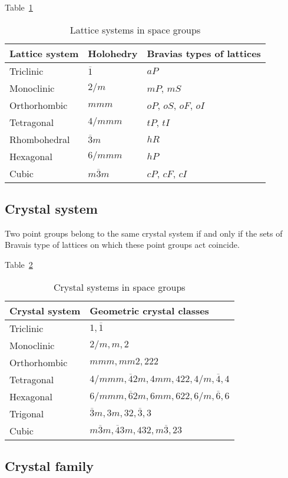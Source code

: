 
Table~\ref{tab:lattice_system}

\begin{table}[htb]
  \centering
  \caption{Lattice systems in space groups}
  \label{tab:lattice_system}
  \begin{tabular}[h]{lll}
    \hline
    Lattice system & Holohedry & Bravias types of lattices \\ \hline
    Triclinic    & $\overline{1}$   & $aP$                   \\
    Monoclinic   & $2/m$            & $mP$, $mS$             \\
    Orthorhombic & $mmm$            & $oP$, $oS$, $oF$, $oI$ \\
    Tetragonal   & $4/mmm$          & $tP$, $tI$             \\
    Rhombohedral & $\overline{3}m$  & $hR$                   \\
    Hexagonal    & $6/mmm$          & $hP$                   \\
    Cubic        & $m\overline{3}m$ & $cP$, $cF$, $cI$       \\ \hline
  \end{tabular}
\end{table}

\subsection{\label{sec:crystal-system}Crystal system}

\todo{}

Two point groups belong to the same crystal system if and only if the sets of Bravais type of lattices on which these point groups act coincide.

Table~\ref{tab:crystal_system}

\begin{table}[htb]
  \centering
  \caption{Crystal systems in space groups}
  \label{tab:crystal_system}
  \begin{tabular}{ll}
    \hline
    Crystal system & Geometric crystal classes                                \\ \hline
    Triclinic      & $1, \overline{1}$                                        \\
    Monoclinic     & $2/m, m, 2$                                              \\
    Orthorhombic   & $mmm, mm2, 222$                                          \\
    Tetragonal     & $4/mmm, \overline{4}2m, 4mm, 422, 4/m, \overline{4}, 4$  \\
    Hexagonal      & $6/mmm, \overline{6}2m, 6mm, 622, 6/m, \overline{6}, 6$  \\
    Trigonal       & $\overline{3}m, 3m, 32, \overline{3}, 3$                 \\
    Cubic          & $m\overline{3}m, \overline{4}3m, 432, m\overline{3}, 23$ \\ \hline
  \end{tabular}
\end{table}

\subsection{\label{sec:crystal-family}Crystal family}

